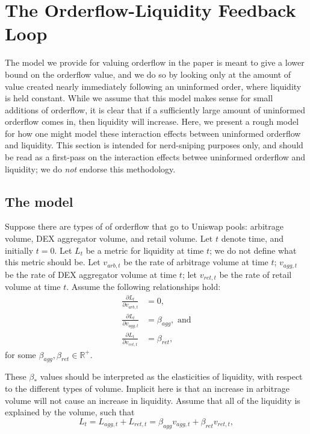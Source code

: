 \section{The Orderflow-Liquidity Feedback Loop} \label{appendix:oflow-liq-feedback}
    The model we provide for valuing orderflow in the paper is meant to give a lower bound on the orderflow value, and we do so by looking only at the amount of value created nearly immediately following an uninformed order, where liquidity is held constant. While we assume that this model makes sense for small additions of orderflow, it is clear that if a sufficiently large amount of uninformed orderflow comes in, then liquidity will increase. Here, we present a rough model for how one might model these interaction effects between uninformed orderflow and liquidity. This section is intended for nerd-sniping purposes only, and should be read as a first-pass on the interaction effects betwee uninformed orderflow and liquidity; we do \textit{not} endorse this methodology.

    \subsection{The model}
    Suppose there are types of of orderflow that go to Uniswap pools: arbitrage volume, DEX aggregator volume, and retail volume. Let $t$ denote time, and initially $t=0$. Let $L_t$ be a metric for liquidity at time $t$; we do not define what this metric should be. Let $v_{arb,t}$ be the rate of arbitrage volume at time $t$; $v_{agg,t}$ be the rate of DEX aggregator volume at time $t$; let $v_{ret,t}$ be the rate of retail volume at time $t$. 
    Assume the following relationships hold:
        \begin{align*}
            \frac{\partial L_t}{\partial v_{arb,t}} & = 0, \\
            \frac{\partial L_t}{\partial v_{agg,t}} & = \beta_{agg}, \text{ and} \\
            \frac{\partial L_t}{\partial v_{ret,t}} & = \beta_{ret},
        \end{align*}
    for some $\beta_{agg}, \beta_{ret} \in \mathbb R^+$.

    These $\beta_{*}$ values should be interpreted as the elasticities of liquidity, with respect to the different types of volume. Implicit here is that an increase in arbitrage volume will not cause an increase in liquidity. Assume that all of the liquidity is explained by the volume, such that
        \begin{equation} \label{eq:uni-liquidity}
            L_t = L_{agg,t} + L_{ret,t} = \beta_{agg} v_{agg,t} + \beta_{ret} v_{ret,t},
        \end{equation}

